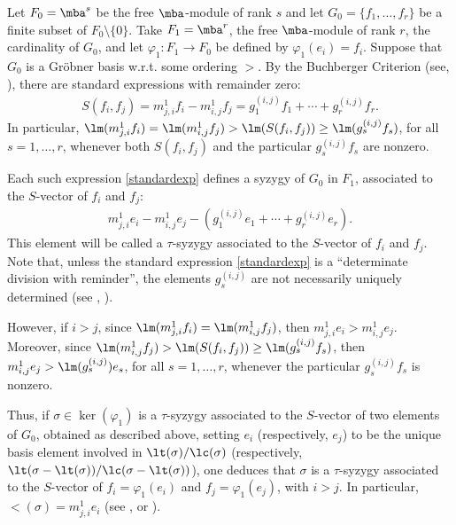 \begin{discussion}\label{disc}
Let $F_0=\mba^s$ be the free $\mba$-module of rank $s$ and let
$G_0=\{f_1,\ldots ,f_r\}$ be a finite subset of
$F_0\setminus\{0\}$. Take $F_1=\mba^r$, the free $\mba$-module of rank
$r$, the cardinality of $G_0$, and let $\varphi_1:F_1\rightarrow F_0$
be defined by $\varphi_1(e_i)=f_i$. Suppose that $G_0$ is a Gr\"obner
basis w.r.t. some ordering $>$. By the Buchberger Criterion (see,
\eg \cite[Theorem~15.8]{eisenbud}), there are standard
expressions with remainder zero:
\begin{eqnarray}\label{standardexp}
S(f_i,f_j)=m^1_{j,i}f_i-m^1_{i,j}f_j=g_1^{(i,j)}f_1+\cdots
+g_r^{(i,j)}f_r.
\end{eqnarray}
In particular, $\lm(m^1_{j,i}f_i)=\lm(m^1_{i,j}f_j)>\lm(S(f_i,f_j))
\geq \lm(g_s^{(i,j)}f_s)$, for all $s=1,\ldots, r$, whenever both
$S(f_i,f_j)$ and the particular $g_s^{(i,j)}f_s$ are nonzero.

Each such expression \eqref{standardexp} defines a syzygy of $G_0$ in
$F_1$, associated to the $S$-vector of $f_i$ and $f_j$:
\begin{eqnarray}\label{syzygy}
m^1_{j,i}e_i-m^1_{i,j}e_j-(g_1^{(i,j)}e_1+\cdots
+g_r^{(i,j)}e_r).
\end{eqnarray}
This element will be called a $\tau$-syzygy associated to the
$S$-vector of $f_i$ and $f_j$. Note that, unless the standard
expression \eqref{standardexp} is a ``determinate division with
reminder'', the elements $g_s^{(i,j)}$ are not necessarily uniquely
determined (see \cite[Theorem~1.3]{bs}, \cite[Theorem~2.2.12]{ds}).

However, if $i>j$, since $\lm(m^1_{j,i}f_i)=\lm(m^1_{i,j}f_j)$, then
$m^1_{j,i}e_i>m^1_{i,j}e_j$.  Moreover, since
$\lm(m^1_{i,j}f_j)>\lm(S(f_i,f_j))\geq \lm(g_s^{(i,j)}f_s)$, then
$m^1_{i,j}e_j>\lm(g_s^{(i,j)})e_s$, for all $s=1,\ldots ,r$, whenever
the particular $g_s^{(i,j)}f_s$ is nonzero.

Thus, if $\sigma\in\ker(\varphi_1)$ is a $\tau$-syzygy associated to
the $S$-vector of two elements of $G_0$, obtained as described above,
setting $e_i$ (respectively, $e_j$) to be the unique basis element
involved in $\lt(\sigma)/\lc(\sigma)$ (respectively, 
$\lt(\sigma-\lt(\sigma))/\lc(\sigma-\lt(\sigma))$), one deduces
that $\sigma$ is a $\tau$-syzygy associated to the $S$-vector of
$f_i=\varphi_1(e_i)$ and $f_j=\varphi_1(e_j)$, with $i>j$. In
particular, $\lt(\sigma)=m^1_{j,i}e_i$ (see \cite[p.6]{bs},
\cite[p.68]{ds} or \cite[Remark~3.6]{emss}).


\end{discussion}
